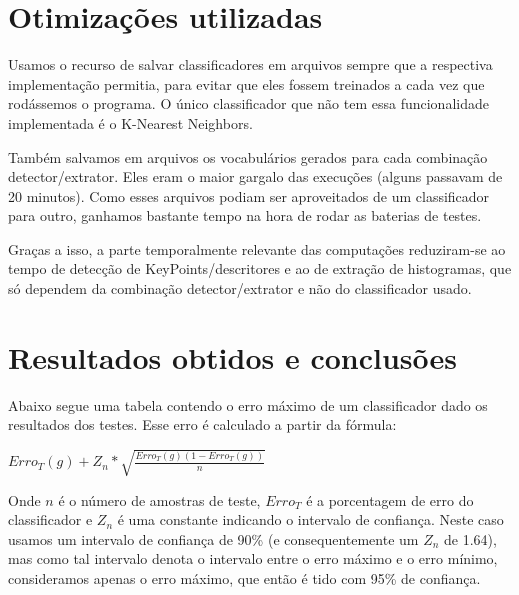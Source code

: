 \documentclass[a4paper,11pt]{article}
\begin{document}
\section{Otimizações utilizadas}

  Usamos o recurso de salvar classificadores em arquivos sempre que a respectiva
  implementação permitia, para evitar que eles fossem treinados a cada vez que
  rodássemos o programa. O único classificador que não tem essa funcionalidade
  implementada é o K-Nearest Neighbors.

  Também salvamos em arquivos os vocabulários gerados para cada combinação
  detector/extrator. Eles eram o maior gargalo das execuções (alguns passavam de
  20 minutos). Como esses arquivos podiam ser aproveitados de um classificador
  para outro, ganhamos bastante tempo na hora de rodar as baterias de testes.

  Graças a isso, a parte temporalmente relevante das computações reduziram-se ao
  tempo de detecção de KeyPoints/descritores e ao de extração de histogramas,
  que só dependem da combinação detector/extrator e não do classificador usado.

\section{Resultados obtidos e conclusões}

  Abaixo segue uma tabela contendo o erro máximo de um classificador dado os
  resultados dos testes. Esse erro é calculado a partir da fórmula:

  \begin{center}
    $ Erro_T(g)+Z_n * \sqrt{\frac{Erro_T(g)(1 - Erro_T(g))}{n}} $
  \end{center}

  Onde $n$ é o número de amostras de teste, $Erro_T$ é a porcentagem de erro do
  classificador e $Z_n$ é uma constante indicando o intervalo de confiança.
  Neste caso usamos um intervalo de confiança de 90\% (e consequentemente um
  $Z_n$ de 1.64), mas como tal intervalo denota o intervalo entre o erro máximo
  e o erro mínimo, consideramos apenas o erro máximo, que então é tido com 95\%
  de confiança.
\end{document}
